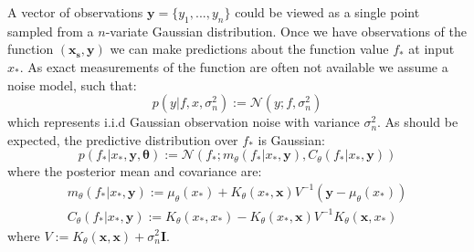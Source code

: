 \documentclass{article}
\newcommand{\xd}{\mathbf{x}}
\newcommand{\yd}{\mathbf{y}}
\begin{document}
A vector of observations $\mathbf{y} = \{ y_1,...,y_n\}$ could be viewed as a single point sampled from a $n$-variate Gaussian distribution. Once we have observations of the function $(\mathbf{x_s},\yd)$ we can make predictions about the function value $f_*$ at input $x_*$. As exact measurements of the function are often not available we assume a noise model, such that:
\begin{equation}\label{obsnoise}
p(y | f, x, \sigma_n^2) := \mathcal{N}(y; f, \sigma_n^2)
\end{equation} 
which represents i.i.d Gaussian observation noise with variance $\sigma_n^2$. As should be expected, the predictive distribution over $f_*$ is Gaussian:
\begin{equation}\label{posteriorpred}
p(f_* | x_*, \yd,\bm{\theta}) := \mathcal{N} ( f_* ; m_\theta(f_* | x_*, \yd), C_\theta(f_* | x_*, \yd))
\end{equation}
where the posterior mean and covariance are:
\begin{align}
m_\theta(f_* | x_*, \yd) := \mu_\theta(x_*) + K_\theta(x_*,\xd)V^{-1}(\yd - \mu_\theta(x_*))\\
C_\theta(f_* | x_*, \yd) := K_\theta(x_*,x_*) - K_\theta(x_*,\xd)V^{-1}K_\theta(\xd,x_*)
\end{align}
where $V := K_\theta(\xd,\xd) + \sigma_n^2\mathbf{I}$.
\end{document}
